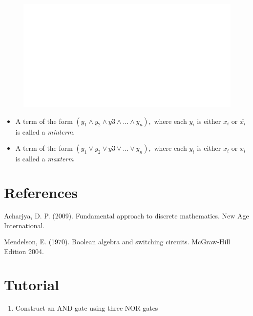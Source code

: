 \documentclass[]{book}
\providecommand{\tightlist}{%
  \setlength{\itemsep}{0pt}\setlength{\parskip}{0pt}}
\begin{document}
\begin{figure}

{\centering \includegraphics[width=1\linewidth]{figure/boxC417-1} 

}

\end{figure}

\begin{itemize}
\tightlist
\item
  A term of the form \((y_1\land y_2 \land y3 \land \dots \land y_n),\) where each \(y_i\) is either \(x_i\) or \(\bar{x_i}\) is called a \emph{minterm}.
\item
  A term of the form \((y_1 \lor y_2 \lor y3 \lor \dots \lor y_n),\) where each \(y_i\) is either \(x_i\) or \(\bar{x_i}\) is called a \emph{maxterm}
\end{itemize}

\hypertarget{references-2}{%
\section*{References}\label{references-2}}

Acharjya, D. P. (2009). Fundamental approach to discrete mathematics. New Age International.

Mendelson, E. (1970). Boolean algebra and switching circuits. McGraw-Hill Edition 2004.

\newpage


\hypertarget{tutorial-2}{%
\section*{Tutorial}\label{tutorial-2}}

\begin{enumerate}
\def\labelenumi{\arabic{enumi}.}
\tightlist
\item
  Construct an AND gate using three NOR gates
\end{enumerate}
\end{document}
